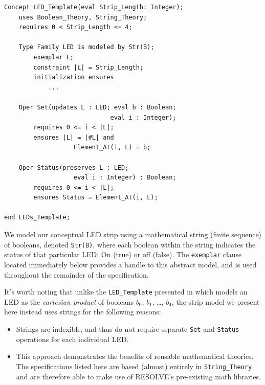 \documentclass{sig-alternate}
\begin{document}
\begin{verbatim}
Concept LED_Template(eval Strip_Length: Integer);
    uses Boolean_Theory, String_Theory;
    requires 0 < Strip_Length <= 4;
	
    Type Family LED is modeled by Str(B);
        exemplar L;
        constraint |L| = Strip_Length;
        initialization ensures 
            ...
    
    Oper Set(updates L : LED; eval b : Boolean; 
                             eval i : Integer);
        requires 0 <= i < |L|;
        ensures |L| = |#L| and 
                   Element_At(i, L) = b;
    
    Oper Status(preserves L : LED; 
                   eval i : Integer) : Boolean;
        requires 0 <= i < |L|;
        ensures Status = Element_At(i, L);
        
end LEDs_Template;
\end{verbatim}

We model our conceptual LED strip using a mathematical string (finite sequence) of booleans, denoted \texttt{Str(B)}, where each boolean within the string indicates the status of that particular LED: On (true) or off (false). The \texttt{exemplar} clause located immediately below provides a handle to this abstract model, and is used throughout the remainder of the specification.


It's worth noting that unlike the \texttt{LED\_Template} presented in \cite{regula:2010} which models an LED as the \textit{cartesian product} of booleans $b_0$, $b_1$, \ldots , $b_4$, the strip model we present here instead uses strings for the following reasons:
\begin{itemize}
\item Strings are indexible, and thus do not require separate \texttt{Set} and \texttt{Status} operations for each individual LED.
\item This approach demonstrates the benefits of reusable mathematical theories. The specifications listed here are based (almost) entirely in \texttt{String\_Theory} and are therefore able to make use of RESOLVE's pre-existing math libraries.
\end{itemize}
\end{document}
